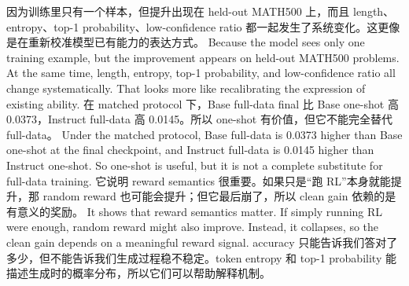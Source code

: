{}\markdownRendererInterblockSeparator
{}因为训练里只有一个样本，但提升出现在 held-out MATH500 上，而且 length、entropy、top-1 probability、low-confidence ratio 都一起发生了系统变化。这更像是在重新校准模型已有能力的表达方式。\markdownRendererInterblockSeparator
{}\markdownRendererInterblockSeparator
{}Because the model sees only one training example, but the improvement appears on held-out MATH500 problems. At the same time, length, entropy, top-1 probability, and low-confidence ratio all change systematically. That looks more like recalibrating the expression of existing ability.\markdownRendererInterblockSeparator
{}\markdownRendererInterblockSeparator
{}\markdownRendererInterblockSeparator
{}在 matched protocol 下，Base full-data final 比 Base one-shot 高 0.0373，Instruct full-data 高 0.0145。所以 one-shot 有价值，但它不能完全替代 full-data。\markdownRendererInterblockSeparator
{}\markdownRendererInterblockSeparator
{}Under the matched protocol, Base full-data is 0.0373 higher than Base one-shot at the final checkpoint, and Instruct full-data is 0.0145 higher than Instruct one-shot. So one-shot is useful, but it is not a complete substitute for full-data training.\markdownRendererInterblockSeparator
{}\markdownRendererInterblockSeparator
{}\markdownRendererInterblockSeparator
{}它说明 reward semantics 很重要。如果只是“跑 RL”本身就能提升，那 random reward 也可能会提升；但它最后崩了，所以 clean gain 依赖的是有意义的奖励。\markdownRendererInterblockSeparator
{}\markdownRendererInterblockSeparator
{}It shows that reward semantics matter. If simply running RL were enough, random reward might also improve. Instead, it collapses, so the clean gain depends on a meaningful reward signal.\markdownRendererInterblockSeparator
{}\markdownRendererInterblockSeparator
{}\markdownRendererInterblockSeparator
{}accuracy 只能告诉我们答对了多少，但不能告诉我们生成过程稳不稳定。token entropy 和 top-1 probability 能描述生成时的概率分布，所以它们可以帮助解释机制。\markdownRendererInterblockSeparator
